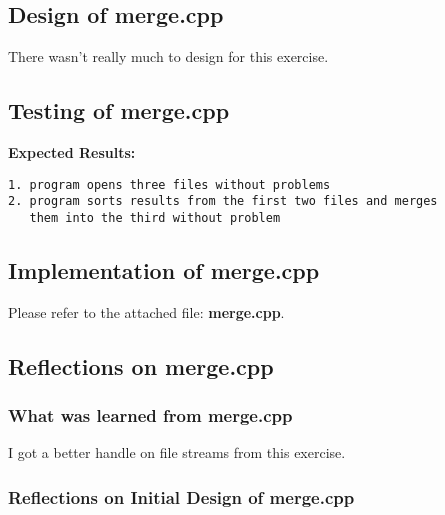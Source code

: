 \documentclass[11pt, oneside]{memoir}
\begin{document}
\subsection{Design of merge.cpp}

There wasn't really much to design for this exercise. 

\subsection{Testing of merge.cpp}

\textbf{Expected Results:}\\
\begin{verbatim}
1. program opens three files without problems
2. program sorts results from the first two files and merges
   them into the third without problem
\end{verbatim}



\subsection{Implementation of merge.cpp}
% 

Please refer to the attached file: \textbf{merge.cpp}.

\subsection{Reflections on merge.cpp}

\subsubsection{What was learned from merge.cpp}

I got a better handle on file streams from this exercise.

\subsubsection{Reflections on Initial Design of merge.cpp}
\end{document}
